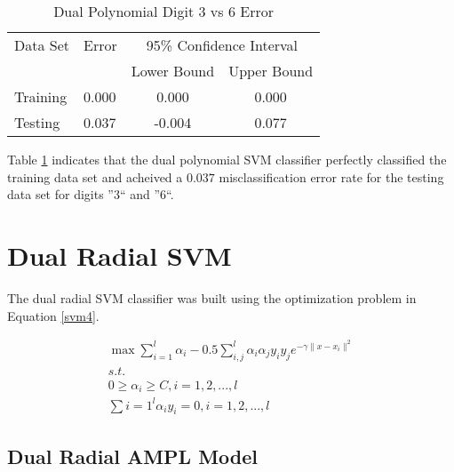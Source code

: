 \documentclass{article}
\begin{document}
\begin{table}\label{table3}
\caption{Dual Polynomial Digit 3 vs 6 Error}
\begin{center}
\begin{tabular}{llcc}
\toprule
Data Set & Error & \multicolumn{2}{c}{95\% Confidence Interval} \\
\cmidrule(r){3-4}
& & Lower Bound & Upper Bound \\
\midrule
Training & 0.000 & 0.000 & 0.000 \\
Testing & 0.037 & -0.004 & 0.077 \\
\bottomrule
\end{tabular}
\end{center}
\end{table}

Table \ref{table3} indicates that the dual polynomial SVM classifier perfectly classified the training data set and acheived a \(0.037\) misclassification error rate for the testing data set for digits ''3`` and ''6``.

\section{Dual Radial SVM}\label{model4}

The dual radial SVM classifier was built using the optimization problem in Equation \ref{svm4}.

\begin{equation}\label{svm4}
\begin{split}
\max \sum_{i=1}^l \alpha_i - 0.5 \sum_{i,j}^l \alpha_i \alpha_j y_i y_j e^{-\gamma \| x - x_i \|^2 } \\
s.t. \\
0 \ge \alpha_i \ge C , i = 1,2,...,l \\
\sum{i=1}^l \alpha_i y_i = 0 , i = 1,2,...,l
\end{split}
\end{equation}

\subsection{Dual Radial AMPL Model}
\end{document}
